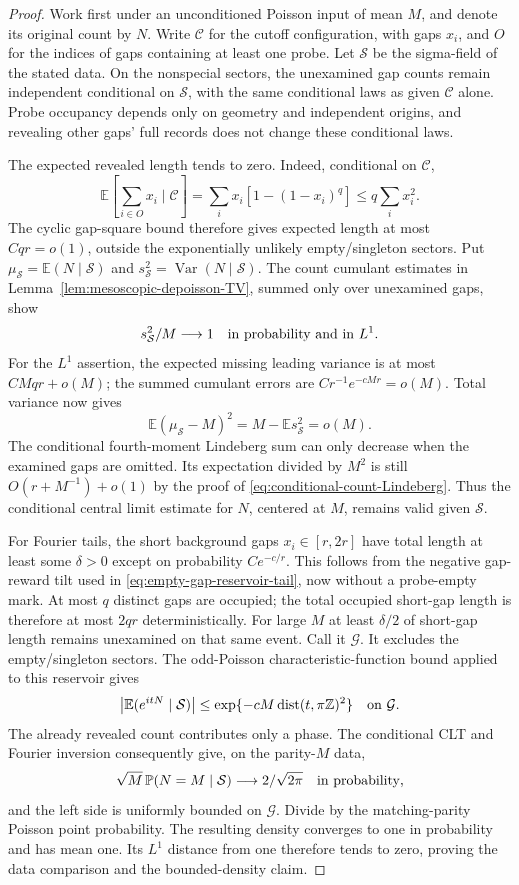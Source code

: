 \documentclass[11pt,letterpaper]{article}
\newcommand{\PP}{\mathbb P}\newcommand{\EE}{\mathbb E}
\begin{document}
\begin{proof}
Work first under an unconditioned Poisson input of mean $M$,
and denote its original count by $N$. Write $\mathcal C$ for
the cutoff configuration, with gaps $x_i$, and $O$ for the
indices of gaps containing at least one probe.
Let $\mathcal S$ be the sigma-field of the stated data.
On the nonspecial sectors, the unexamined gap counts remain
independent conditional on $\mathcal S$, with the same
conditional laws as given $\mathcal C$ alone. Probe occupancy
depends only on geometry and independent origins, and revealing
other gaps' full records does not change these conditional laws.

The expected revealed length tends to zero. Indeed, conditional
on $\mathcal C$,
\[
 \EE\left[\sum_{i\in O}x_i\mid\mathcal C\right]
 =\sum_i x_i[1-(1-x_i)^q]\le q\sum_i x_i^2.
\]
The cyclic gap-square bound therefore gives expected length
at most $Cqr=o(1)$, outside the exponentially unlikely
empty/singleton sectors. Put
$\mu_{\mathcal S}=\EE(N\mid\mathcal S)$ and
$s_{\mathcal S}^2=\operatorname{Var}(N\mid\mathcal S)$.
The count cumulant estimates in
Lemma~\ref{lem:mesoscopic-depoisson-TV}, summed only over
unexamined gaps, show
\[
 s_{\mathcal S}^2/M\longrightarrow1
             \quad\hbox{in probability and in }L^1.
\]
For the $L^1$ assertion, the expected missing leading variance
is at most $CMqr+o(M)$; the summed cumulant errors are
$Cr^{-1}e^{-cMr}=o(M)$. Total variance now gives
\[
 \EE(\mu_{\mathcal S}-M)^2=M-\EE s_{\mathcal S}^2=o(M).
\]
The conditional fourth-moment Lindeberg sum can only decrease
when the examined gaps are omitted. Its expectation divided
by $M^2$ is still $O(r+M^{-1})+o(1)$ by the proof of
\eqref{eq:conditional-count-Lindeberg}. Thus the conditional
central limit estimate for $N$, centered at $M$, remains valid
given $\mathcal S$.

For Fourier tails, the short background gaps $x_i\in[r,2r]$
have total length at least some $\delta>0$ except on probability
$Ce^{-c/r}$. This follows from the negative gap-reward tilt
used in \eqref{eq:empty-gap-reservoir-tail}, now without
a probe-empty mark. At most $q$ distinct gaps are occupied;
the total occupied short-gap length is therefore at most
$2qr$ deterministically. For large $M$ at least $\delta/2$
of short-gap length remains unexamined on that same event.
Call it $\mathcal G$. It excludes the empty/singleton sectors.
The odd-Poisson characteristic-function bound applied to this
reservoir gives
\[
 \left|\EE(e^{itN}\mid\mathcal S)\right|
 \le \exp\{-cM\operatorname{dist}(t,\pi\mathbb Z)^2\}
                        \quad\hbox{on }\mathcal G.
\]
The already revealed count contributes only a phase.
The conditional CLT and Fourier inversion consequently give,
on the parity-$M$ data,
\[
 \sqrt M\,\PP(N=M\mid\mathcal S)
                   \longrightarrow 2/\sqrt{2\pi}
                              \quad\hbox{in probability},
\]
and the left side is uniformly bounded on $\mathcal G$.
Divide by the matching-parity Poisson point probability.
The resulting density converges to one in probability and
has mean one. Its $L^1$ distance from one therefore tends to
zero, proving the data comparison and the bounded-density claim.


\end{proof}
\end{document}
